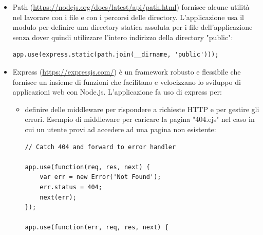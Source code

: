 \documentclass[12pt]{report}
\begin{document}
\begin{itemize}
	\item Path (\url{https://nodejs.org/docs/latest/api/path.html}) fornisce alcune utilità nel lavorare con i file e con i percorsi delle directory. L'applicazione usa il modulo per definire una directory statica assoluta per i file dell'applicazione senza dover quindi utilizzare l'intero indirizzo della directory "public": 
\begin{lstlisting}
app.use(express.static(path.join(__dirname, 'public')));
\end{lstlisting}
	\item Express (\url{https://expressjs.com/}) è un framework robusto e flessibile che fornisce un insieme di funzioni che facilitano e velocizzano lo sviluppo di applicazioni web con Node.js. L'applicazione fa uso di express per:
	\begin{itemize}
		\item definire delle middleware per rispondere a richieste HTTP e per gestire gli errori. Esempio di middleware per caricare la pagina "404.ejs" nel caso in cui un utente provi ad accedere ad una pagina non esistente:
\begin{lstlisting}
// Catch 404 and forward to error handler

app.use(function(req, res, next) {
	var err = new Error('Not Found');
	err.status = 404;
	next(err);
});
	
app.use(function(err, req, res, next) {


\end{lstlisting}
\end{itemize}
\end{itemize}
\end{document}
